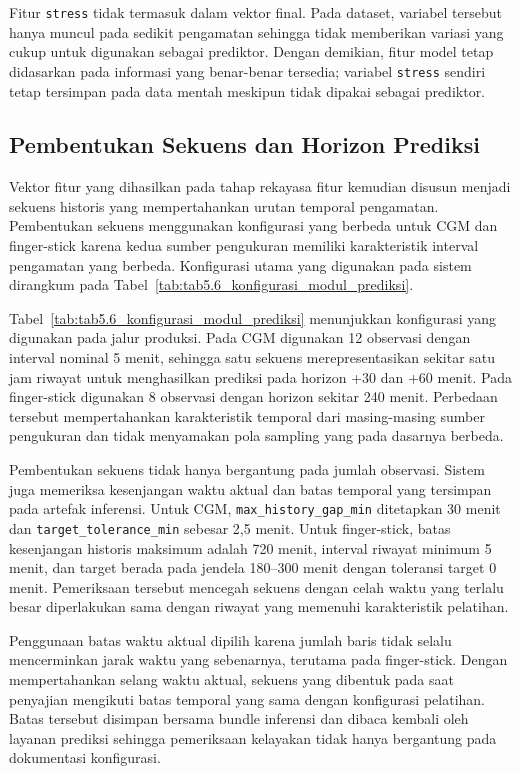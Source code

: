 Fitur \texttt{stress} tidak termasuk dalam vektor final. Pada dataset, variabel tersebut hanya muncul pada sedikit pengamatan sehingga tidak memberikan variasi yang
cukup untuk digunakan sebagai prediktor. Dengan demikian, fitur model tetap didasarkan pada informasi yang benar-benar tersedia; variabel \texttt{stress} sendiri tetap tersimpan pada data mentah
meskipun tidak dipakai sebagai prediktor.

\subsection{Pembentukan Sekuens dan Horizon Prediksi}
\label{subsec:bab5-sekuens-horizon-prediksi}

Vektor fitur yang dihasilkan pada tahap rekayasa fitur kemudian disusun menjadi sekuens historis yang mempertahankan urutan temporal pengamatan. Pembentukan sekuens
menggunakan konfigurasi yang berbeda untuk CGM dan finger-stick karena kedua sumber pengukuran memiliki karakteristik interval pengamatan yang berbeda. Konfigurasi
utama yang digunakan pada sistem dirangkum pada Tabel~\ref{tab:tab5.6_konfigurasi_modul_prediksi}.



Tabel~\ref{tab:tab5.6_konfigurasi_modul_prediksi} menunjukkan konfigurasi yang digunakan pada jalur produksi. Pada CGM digunakan 12 observasi dengan interval
nominal 5 menit, sehingga satu sekuens merepresentasikan sekitar satu jam riwayat untuk menghasilkan prediksi pada horizon +30 dan +60 menit. Pada finger-stick
digunakan 8 observasi dengan horizon sekitar 240 menit. Perbedaan tersebut mempertahankan karakteristik temporal dari masing-masing sumber pengukuran dan tidak
menyamakan pola sampling yang pada dasarnya berbeda.

Pembentukan sekuens tidak hanya bergantung pada jumlah observasi. Sistem juga memeriksa kesenjangan waktu aktual dan batas temporal yang tersimpan pada artefak
inferensi. Untuk CGM, \texttt{max\_history\_gap\_min} ditetapkan 30 menit dan \texttt{target\_tolerance\_min} sebesar 2,5 menit. Untuk finger-stick, batas
kesenjangan historis maksimum adalah 720 menit, interval riwayat minimum 5 menit, dan target berada pada jendela 180--300 menit dengan toleransi target 0 menit.
Pemeriksaan tersebut mencegah sekuens dengan celah waktu yang terlalu besar diperlakukan sama dengan riwayat yang memenuhi karakteristik pelatihan.

Penggunaan batas waktu aktual dipilih karena jumlah baris tidak selalu mencerminkan jarak waktu yang sebenarnya, terutama pada finger-stick. Dengan mempertahankan
selang waktu aktual, sekuens yang dibentuk pada saat penyajian mengikuti batas temporal yang sama dengan konfigurasi pelatihan. Batas tersebut disimpan bersama
bundle inferensi dan dibaca kembali oleh layanan prediksi sehingga pemeriksaan kelayakan tidak hanya bergantung pada dokumentasi konfigurasi.

